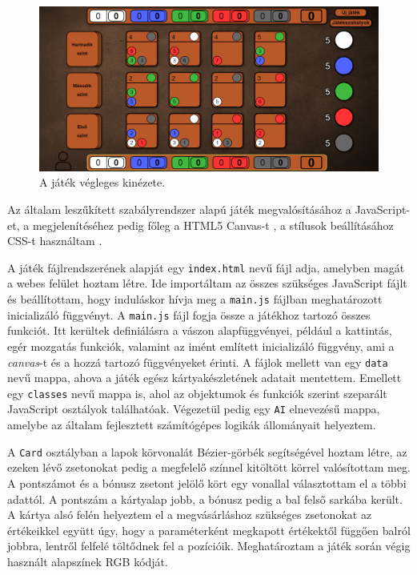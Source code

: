 \begin{figure}[h]
\centering
\includegraphics[width=\textwidth]{images/screen_structure.png}
\caption{A játék végleges kinézete.}
\label{fig:screen_structure}
\end{figure}


Az általam leszűkített szabályrendszer alapú játék megvalósításához a JavaScript-et, a megjelenítéséhez pedig főleg a HTML5 Canvas-t \cite{fulton2013html5}, a stílusok beállításához CSS-t használtam \cite{gasston2011book}.


A játék fájlrendszerének alapját egy \texttt{index.html} nevű fájl adja, amelyben magát a webes felület hoztam létre. Ide importáltam az összes szükséges JavaScript fájlt és beállítottam, hogy induláskor hívja meg a \texttt{main.js} fájlban meghatározott inicializáló függvényt. A \texttt{main.js} fájl fogja össze a játékhoz tartozó összes funkciót. Itt kerültek definiálásra a vászon alapfüggvényei, például a kattintás, egér mozgatás funkciók, valamint az imént említett inicializáló függvény, ami a \textit{canvas}-t és a hozzá tartozó függvényeket érinti. A fájlok mellett van egy \texttt{data} nevű mappa, ahova a játék egész kártyakészletének adatait mentettem. Emellett egy \texttt{classes} nevű mappa is, ahol az objektumok és funkciók szerint szeparált JavaScript osztályok találhatóak. Végezetül pedig egy \texttt{AI} elnevezésű mappa, amelybe az általam fejlesztett számítógépes logikák állományait helyeztem.


A \texttt{Card} osztályban a lapok körvonalát Bézier-görbék segítségével hoztam létre, az ezeken lévő zsetonokat pedig a megfelelő színnel kitöltött körrel valósítottam meg. A pontszámot és a bónusz zsetont jelölő kört egy vonallal választottam el a többi adattól. A pontszám a kártyalap jobb, a bónusz pedig a bal felső sarkába került. A kártya alsó felén helyeztem el a megvásárláshoz szükséges zsetonokat az értékeikkel együtt úgy, hogy a paraméterként megkapott értékektől függően balról jobbra, lentről felfelé töltődnek fel a pozícióik. Meghatároztam a játék során végig használt alapszínek RGB kódját.

